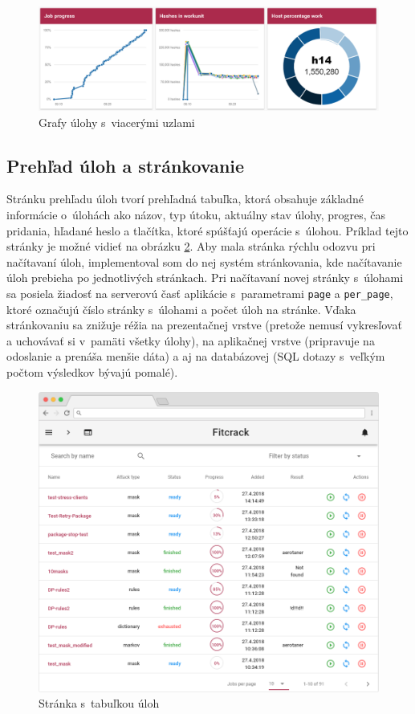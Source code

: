 \documentclass[slovak]{fitthesis}
\begin{document}
\begin{figure}[H]
    \centering
    \includegraphics[scale=0.56]{obrazky/graf2.PNG}
    \caption{Grafy úlohy s~viacerými uzlami}
    \label{fig:graf2}
\end{figure}

\subsection{Prehľad úloh a stránkovanie}
Stránku prehľadu úloh tvorí prehľadná tabuľka, ktorá obsahuje základné informácie o~úlohách ako názov, typ útoku, aktuálny stav úlohy, progres, čas pridania, hľadané heslo a tlačítka, ktoré spúšťajú operácie s~úlohou. Príklad tejto stránky je možné vidieť na obrázku \ref{fig:jobsPage}. Aby mala stránka rýchlu odozvu pri načítavaní úloh, implementoval som do nej systém stránkovania, kde načítavanie úloh prebieha po jednotlivých stránkach. Pri načítavaní novej stránky s~úlohami sa posiela žiadosť na serverovú časť aplikácie s~parametrami \texttt{page} a \texttt{per\_page}, ktoré označujú číslo stránky s~úlohami a počet úloh na stránke. Vďaka stránkovaniu sa znižuje réžia na prezentačnej vrstve (pretože nemusí vykresľovať a uchovávať si v~pamäti všetky úlohy), na aplikačnej vrstve (pripravuje na odoslanie a prenáša menšie dáta) a aj na databázovej (SQL dotazy s~veľkým počtom výsledkov bývajú pomalé).
\begin{figure}[H]
    \centering
    \includegraphics[scale=0.46]{obrazky/jobsFrame2.PNG}
    \caption{Stránka s~tabuľkou úloh}
    \label{fig:jobsPage}
\end{figure}
\end{document}
